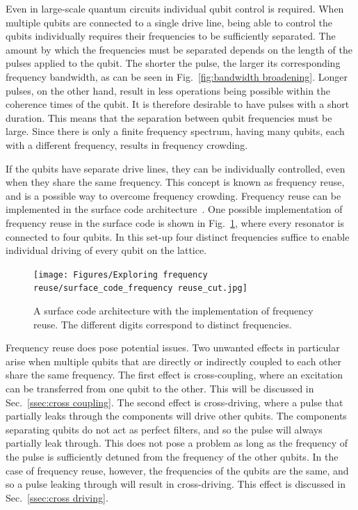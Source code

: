       Even in large-scale quantum circuits individual qubit control is required. When multiple qubits are connected to a single drive line, being able to control the qubits individually requires their frequencies to be sufficiently separated. The amount by which the frequencies must be separated depends on the length of the pulses applied to the qubit. The shorter the pulse, the larger its corresponding frequency bandwidth, as can be seen in Fig.~\ref{fig:bandwidth broadening}. Longer pulses, on the other hand, result in less operations being possible within the coherence times of the qubit. It is therefore desirable to have pulses with a short duration. This means that the separation between qubit frequencies must be large. Since there is only a finite frequency spectrum, having many qubits, each with a different frequency, results in frequency crowding.

      If the qubits have separate drive lines, they can be individually controlled, even when they share the same frequency. This concept is known as frequency reuse, and is a possible way to overcome frequency crowding. Frequency reuse can be implemented in the surface code architecture~\cite{fowler2009high}. One possible implementation of frequency reuse in the surface code is shown in Fig.~\ref{fig:surface code frequency reuse}, where every resonator is connected to four qubits. In this set-up four distinct frequencies suffice to enable individual driving of every qubit on the lattice.

      \begin{figure}[h]
        \centering
        \texttt{[image: Figures/Exploring frequency reuse/surface\_code\_frequency reuse\_cut.jpg]}
        \caption{A surface code architecture with the implementation of frequency reuse. The different digits correspond to distinct frequencies. }
        \label{fig:surface code frequency reuse}
      \end{figure}

      Frequency reuse does pose potential issues. Two unwanted effects in particular arise when multiple qubits that are directly or indirectly coupled to each other share the same frequency. The first effect is cross-coupling, where an excitation can be transferred from one qubit to the other. This will be discussed in Sec.~\ref{ssec:cross coupling}. The second effect is cross-driving, where a pulse that partially leaks through the components will drive other qubits. The components separating qubits do not act as perfect filters, and so the pulse will always partially leak through. This does not pose a problem as long as the frequency of the pulse is sufficiently detuned from the frequency of the other qubits. In the case of frequency reuse, however, the frequencies of the qubits are the same, and so a pulse leaking through will result in cross-driving. This effect is discussed in Sec.~\ref{ssec:cross driving}.

